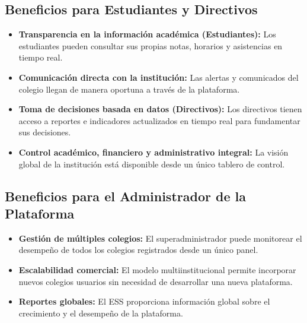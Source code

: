 \documentclass[12pt,a4paper,oneside]{report}
\begin{document}
\subsection{Beneficios para Estudiantes y Directivos}
\begin{itemize}
  \item \textbf{Transparencia en la información académica (Estudiantes):} Los estudiantes pueden consultar sus propias notas, horarios y asistencias en tiempo real.
  \item \textbf{Comunicación directa con la institución:} Las alertas y comunicados del colegio llegan de manera oportuna a través de la plataforma.
  \item \textbf{Toma de decisiones basada en datos (Directivos):} Los directivos tienen acceso a reportes e indicadores actualizados en tiempo real para fundamentar sus decisiones.
  \item \textbf{Control académico, financiero y administrativo integral:} La visión global de la institución está disponible desde un único tablero de control.
\end{itemize}

\subsection{Beneficios para el Administrador de la Plataforma}
\begin{itemize}
  \item \textbf{Gestión de múltiples colegios:} El superadministrador puede monitorear el desempeño de todos los colegios registrados desde un único panel.
  \item \textbf{Escalabilidad comercial:} El modelo multiinstitucional permite incorporar nuevos colegios usuarios sin necesidad de desarrollar una nueva plataforma.
  \item \textbf{Reportes globales:} El ESS proporciona información global sobre el crecimiento y el desempeño de la plataforma.
\end{itemize}
\end{document}
